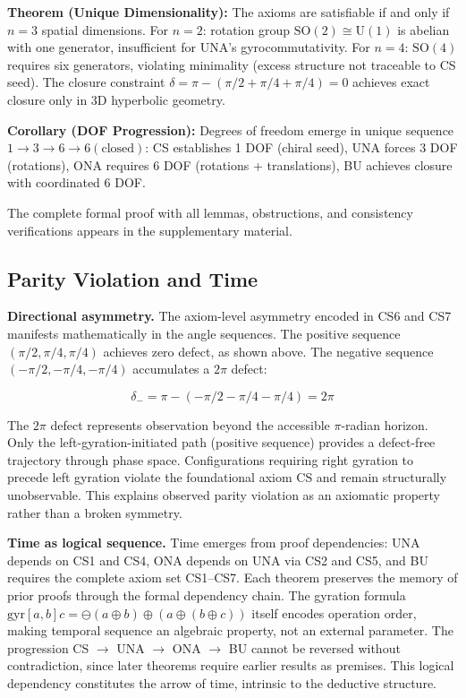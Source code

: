 \documentclass[11pt,a4paper]{article}
\theoremstyle{definition}
\theoremstyle{remark}
\begin{document}
\textbf{Theorem (Unique Dimensionality):} The axioms are satisfiable if and only if $n = 3$ spatial dimensions. For $n = 2$: rotation group $\mathrm{SO}(2) \cong \mathrm{U}(1)$ is abelian with one generator, insufficient for UNA's gyrocommutativity. For $n = 4$: $\mathrm{SO}(4)$ requires six generators, violating minimality (excess structure not traceable to CS seed). The closure constraint $\delta = \pi - (\pi/2 + \pi/4 + \pi/4) = 0$ achieves exact closure only in 3D hyperbolic geometry.

\textbf{Corollary (DOF Progression):} Degrees of freedom emerge in unique sequence $1 \to 3 \to 6 \to 6(\text{closed})$: CS establishes 1 DOF (chiral seed), UNA forces 3 DOF (rotations), ONA requires 6 DOF (rotations + translations), BU achieves closure with coordinated 6 DOF.

The complete formal proof with all lemmas, obstructions, and consistency verifications appears in the supplementary material.

\subsection{Parity Violation and Time}

\textbf{Directional asymmetry.} The axiom-level asymmetry encoded in CS6 and CS7 manifests mathematically in the angle sequences. The positive sequence $(\pi/2, \pi/4, \pi/4)$ achieves zero defect, as shown above. The negative sequence $(-\pi/2, -\pi/4, -\pi/4)$ accumulates a $2\pi$ defect:

\begin{equation}
\delta_- = \pi - (-\pi/2 - \pi/4 - \pi/4) = 2\pi
\end{equation}

The $2\pi$ defect represents observation beyond the accessible $\pi$-radian horizon. Only the left-gyration-initiated path (positive sequence) provides a defect-free trajectory through phase space. Configurations requiring right gyration to precede left gyration violate the foundational axiom CS and remain structurally unobservable. This explains observed parity violation as an axiomatic property rather than a broken symmetry.

\textbf{Time as logical sequence.} Time emerges from proof dependencies: UNA depends on CS1 and CS4, ONA depends on UNA via CS2 and CS5, and BU requires the complete axiom set CS1--CS7. Each theorem preserves the memory of prior proofs through the formal dependency chain. The gyration formula $\mathrm{gyr}[a,b]c = \ominus(a \oplus b) \oplus (a \oplus (b \oplus c))$ itself encodes operation order, making temporal sequence an algebraic property, not an external parameter. The progression CS $\to$ UNA $\to$ ONA $\to$ BU cannot be reversed without contradiction, since later theorems require earlier results as premises. This logical dependency constitutes the arrow of time, intrinsic to the deductive structure.
\end{document}
